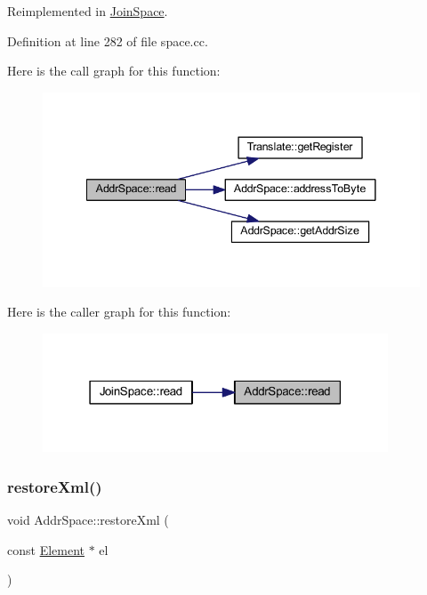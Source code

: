 Reimplemented in \mbox{\hyperlink{class_join_space_a8f644b1eaf92bece425a3712a205fa3b}{Join\+Space}}.



Definition at line 282 of file space.\+cc.

Here is the call graph for this function\+:
\nopagebreak
\begin{figure}[H]
\begin{center}
\leavevmode
\includegraphics[width=341pt]{class_addr_space_ad0a4a2744ee7de8f592dfaf817a6c93b_cgraph}
\end{center}
\end{figure}
Here is the caller graph for this function\+:
\nopagebreak
\begin{figure}[H]
\begin{center}
\leavevmode
\includegraphics[width=291pt]{class_addr_space_ad0a4a2744ee7de8f592dfaf817a6c93b_icgraph}
\end{center}
\end{figure}
\mbox{\label{class_addr_space_aa2fe50d288eef7ea713cce99774c4eca}} 
\subsubsection{\texorpdfstring{restoreXml()}{restoreXml()}}
{\footnotesize\ttfamily void Addr\+Space\+::restore\+Xml (\begin{DoxyParamCaption}\item[{const \mbox{\hyperlink{class_element}{Element}} $\ast$}]{el }\end{DoxyParamCaption})\hspace{0.3cm}{\ttfamily [virtual]}}




